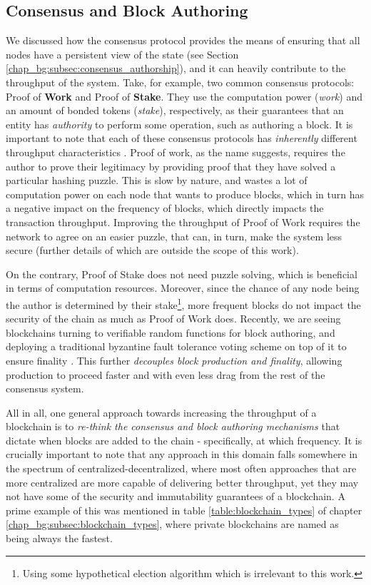 \subsection{Consensus and Block Authoring}
We discussed how the consensus protocol provides the means of ensuring that all nodes have a
persistent view of the state (see Section \ref{chap_bg:subsec:consensus_authorship}), and it can
heavily contribute to the throughput of the system. Take, for example, two common consensus
protocols: Proof of \textbf{Work} and Proof of \textbf{Stake}. They use the computation power
(\textit{work}) and an amount of bonded tokens (\textit{stake}), respectively, as their guarantees
that an entity has \textit{authority} to perform some operation, such as authoring a block. It is
important to note that each of these consensus protocols has \textit{inherently} different
throughput characteristics \cite{meneghettiSurveyEfficientParallelization2019}. Proof of work, as
the name suggests, requires the author to prove their legitimacy by providing proof that they have
solved a particular hashing puzzle. This is slow by nature, and wastes a lot of computation power on
each node that wants to produce blocks, which in turn has a negative impact on the frequency of
blocks, which directly impacts the transaction throughput. Improving the throughput of Proof of Work
requires the network to agree on an easier puzzle, that can, in turn, make the system less secure
\cite{gervaisSecurityPerformanceProof2016} (further details of which are outside the scope of this
work).

On the contrary, Proof of Stake does not need puzzle solving, which is beneficial in terms of
computation resources. Moreover, since the chance of any node being the author is determined by
their stake\footnote{Using some hypothetical election algorithm which is irrelevant to this work.},
more frequent blocks do not impact the security of the chain as much as Proof of Work does.
Recently, we are seeing blockchains turning to verifiable random functions
\cite{dodisVerifiableRandomFunction2005} for block authoring, and deploying a traditional byzantine
fault tolerance voting scheme on top of it to ensure finality
\cite{buterinCasperFriendlyFinality2019, stewartPosterGRANDPAFinality2019}. This further
\textit{decouples block production and finality}, allowing production to proceed faster and with
even less drag from the rest of the consensus system.

All in all, one general approach towards increasing the throughput of a blockchain is to
\textit{re-think the consensus and block authoring mechanisms} that dictate when blocks are added to
the chain - specifically, at which frequency. It is crucially important to note that any approach in
this domain falls somewhere in the spectrum of centralized-decentralized, where most often
approaches that are more centralized are more capable of delivering better throughput, yet they may
not have some of the security and immutability guarantees of a blockchain. A prime example of this
was mentioned in table \ref{table:blockchain_types} of chapter
\ref{chap_bg:subsec:blockchain_types}, where private blockchains are named as being always the
fastest.

